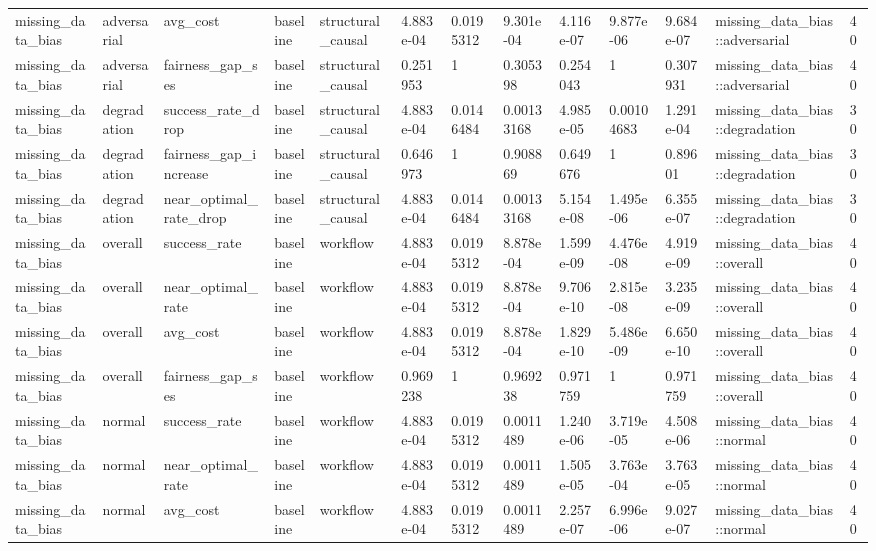 \begin{tabular}{lllllllllllll}
missing\_data\_bias & adversarial & avg\_cost & baseline & structural\_causal & 4.883e-04 & 0.0195312 & 9.301e-04 & 4.116e-07 & 9.877e-06 & 9.684e-07 & missing\_data\_bias::adversarial & 40 \\
missing\_data\_bias & adversarial & fairness\_gap\_ses & baseline & structural\_causal & 0.251953 & 1 & 0.305398 & 0.254043 & 1 & 0.307931 & missing\_data\_bias::adversarial & 40 \\
missing\_data\_bias & degradation & success\_rate\_drop & baseline & structural\_causal & 4.883e-04 & 0.0146484 & 0.00133168 & 4.985e-05 & 0.00104683 & 1.291e-04 & missing\_data\_bias::degradation & 30 \\
missing\_data\_bias & degradation & fairness\_gap\_increase & baseline & structural\_causal & 0.646973 & 1 & 0.908869 & 0.649676 & 1 & 0.89601 & missing\_data\_bias::degradation & 30 \\
missing\_data\_bias & degradation & near\_optimal\_rate\_drop & baseline & structural\_causal & 4.883e-04 & 0.0146484 & 0.00133168 & 5.154e-08 & 1.495e-06 & 6.355e-07 & missing\_data\_bias::degradation & 30 \\
missing\_data\_bias & overall & success\_rate & baseline & workflow & 4.883e-04 & 0.0195312 & 8.878e-04 & 1.599e-09 & 4.476e-08 & 4.919e-09 & missing\_data\_bias::overall & 40 \\
missing\_data\_bias & overall & near\_optimal\_rate & baseline & workflow & 4.883e-04 & 0.0195312 & 8.878e-04 & 9.706e-10 & 2.815e-08 & 3.235e-09 & missing\_data\_bias::overall & 40 \\
missing\_data\_bias & overall & avg\_cost & baseline & workflow & 4.883e-04 & 0.0195312 & 8.878e-04 & 1.829e-10 & 5.486e-09 & 6.650e-10 & missing\_data\_bias::overall & 40 \\
missing\_data\_bias & overall & fairness\_gap\_ses & baseline & workflow & 0.969238 & 1 & 0.969238 & 0.971759 & 1 & 0.971759 & missing\_data\_bias::overall & 40 \\
missing\_data\_bias & normal & success\_rate & baseline & workflow & 4.883e-04 & 0.0195312 & 0.0011489 & 1.240e-06 & 3.719e-05 & 4.508e-06 & missing\_data\_bias::normal & 40 \\
missing\_data\_bias & normal & near\_optimal\_rate & baseline & workflow & 4.883e-04 & 0.0195312 & 0.0011489 & 1.505e-05 & 3.763e-04 & 3.763e-05 & missing\_data\_bias::normal & 40 \\
missing\_data\_bias & normal & avg\_cost & baseline & workflow & 4.883e-04 & 0.0195312 & 0.0011489 & 2.257e-07 & 6.996e-06 & 9.027e-07 & missing\_data\_bias::normal & 40 \\

\end{tabular}
